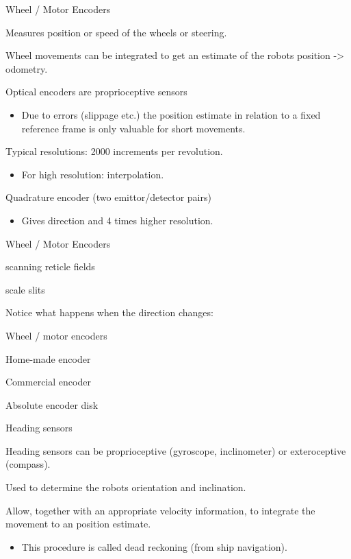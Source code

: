 \documentclass[compress]{beamer}
\begin{document}
\begin{frame}{Wheel / Motor Encoders}

Measures position or speed of the wheels or steering.

Wheel movements can be integrated to get an estimate of the robots
position -\textgreater{} odometry.

Optical encoders are proprioceptive sensors

\begin{itemize}

\item
  Due to errors (slippage etc.) the position estimate in relation to a
  fixed reference frame is only valuable for short movements.
\end{itemize}

Typical resolutions: 2000 increments per revolution.

\begin{itemize}

\item
  For high resolution: interpolation.
\end{itemize}

Quadrature encoder (two emittor/detector pairs)

\begin{itemize}

\item
  Gives direction and 4 times higher resolution.
\end{itemize}

\end{frame}

\begin{frame}{Wheel / Motor Encoders}

scanning reticle fields

scale slits

Notice what happens when the direction changes:

\end{frame}

\begin{frame}{Wheel / motor encoders}

Home-made encoder

Commercial encoder

Absolute encoder disk

\end{frame}

\begin{frame}{Heading sensors}

Heading sensors can be proprioceptive (gyroscope, inclinometer) or
exteroceptive (compass).

Used to determine the robots orientation and inclination.

Allow, together with an appropriate velocity information, to integrate
the movement to an position estimate.

\begin{itemize}

\item
  This procedure is called dead reckoning (from ship navigation).
\end{itemize}

\end{frame}
\end{document}

